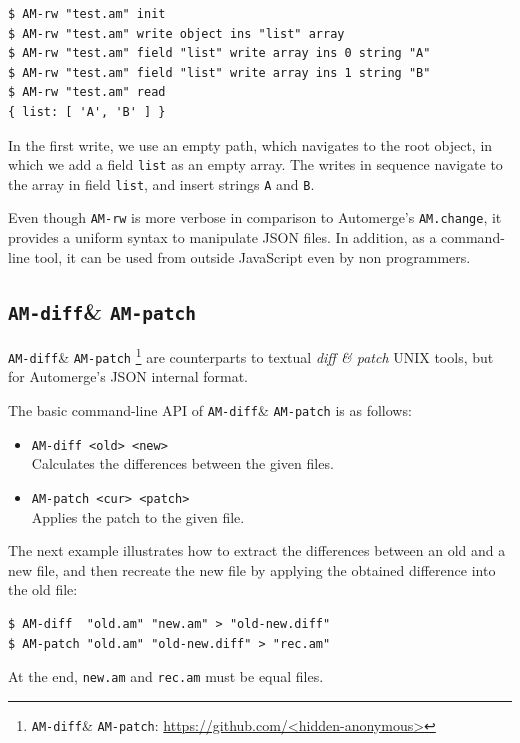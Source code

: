 \documentclass[12pt]{article}
\newcommand{\code}[1]  {\texttt{\footnotesize{#1}}}
\newcommand{\amrw}       {\texttt{AM-rw}\xspace}
\newcommand{\amdiff}     {\texttt{AM-diff}\xspace}
\newcommand{\ampatch}    {\texttt{AM-patch}\xspace}
\begin{document}
{\footnotesize
\begin{verbatim}
$ AM-rw "test.am" init
$ AM-rw "test.am" write object ins "list" array
$ AM-rw "test.am" field "list" write array ins 0 string "A"
$ AM-rw "test.am" field "list" write array ins 1 string "B"
$ AM-rw "test.am" read
{ list: [ 'A', 'B' ] }
\end{verbatim}
}

In the first write, we use an empty path, which navigates to the root object,
in which we add a field \code{list} as an empty array.
The writes in sequence navigate to the array in field \code{list}, and insert
strings \code{A} and \code{B}.

Even though \amrw is more verbose in comparison to Automerge's
\code{AM.change}, it provides a uniform syntax to manipulate JSON files.
In addition, as a command-line tool, it can be used from outside JavaScript
even by non programmers.

\subsection{\amdiff \& \ampatch}

\amdiff \& \ampatch%
    \footnote{\amdiff \& \ampatch: \url{https://github.com/<hidden-anonymous>}}
are counterparts to textual \emph{diff \& patch} UNIX tools, but for
Automerge's JSON internal format.

The basic command-line API of \amdiff \& \ampatch is as follows:

\begin{itemize}
\item \code{AM-diff <old> <new>} \\
    Calculates the differences between the given files.
\item \code{AM-patch <cur> <patch>} \\
    Applies the patch to the given file.
\end{itemize}

The next example illustrates how to extract the differences between an old and
a new file, and then recreate the new file by applying the obtained difference
into the old file:

{\footnotesize
\begin{verbatim}
$ AM-diff  "old.am" "new.am" > "old-new.diff"
$ AM-patch "old.am" "old-new.diff" > "rec.am"
\end{verbatim}
}

At the end, \code{new.am} and \code{rec.am} must be equal files.
\end{document}
